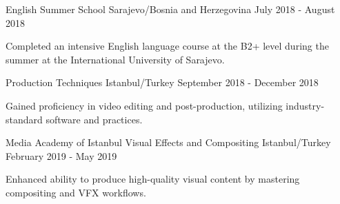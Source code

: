 \begin{cventries}
  \cventry
    {\href{https://www.ius.edu.ba/}{}} %
    {English Summer School} %
    {Sarajevo/Bosnia and Herzegovina} %
    {July 2018 - August 2018} %
    {
      \begin{cvitems} %
        \item {Completed an intensive English language course at the B2+ level during the summer at the International University of Sarajevo.}
      \end{cvitems}
    }


  \cventry
    {\href{https://medyaakademisi.com.tr/}{}} %
    {Production Techniques} %
    {Istanbul/Turkey} %
    {September 2018 - December 2018} %
    {
      \begin{cvitems} %
        \item {Gained proficiency in video editing and post-production, utilizing industry-standard software and practices.}
      \end{cvitems}
    }


  \cventry
    {Media Academy of Istanbul} %
    {Visual Effects and Compositing} %
    {Istanbul/Turkey} %
    {February 2019 - May 2019} %
    {
      \begin{cvitems} %
        \item {Enhanced ability to produce high-quality visual content by mastering compositing and VFX workflows.}
      \end{cvitems}
    }




\end{cventries}